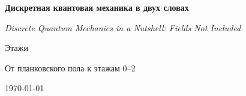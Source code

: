 \begin{titlepage}
  \centering
  \vspace*{2cm}
  {\LARGE\bfseries Дискретная квантовая механика в двух словах\par}
  \vspace{0.35cm}
  {\normalsize\itshape Discrete Quantum Mechanics in a Nutshell: Fields Not Included\par}
  \vspace{0.8cm}
  {\Large Этажи\par}
  \vspace{1.2cm}
  {\large От планковского пола к этажам 0--2\par}
  \vfill
  {\large \today\par}
\end{titlepage}
\clearpage

\clearpage
\tableofcontents
\clearpage
